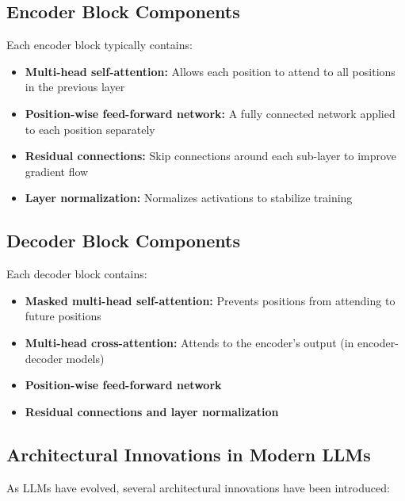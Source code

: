 \documentclass[11pt,a4paper]{report}
\begin{document}
\subsection{Encoder Block Components}
Each encoder block typically contains:
\begin{itemize}
    \item \textbf{Multi-head self-attention:} Allows each position to attend to all positions in the previous layer
    \item \textbf{Position-wise feed-forward network:} A fully connected network applied to each position separately
    \item \textbf{Residual connections:} Skip connections around each sub-layer to improve gradient flow
    \item \textbf{Layer normalization:} Normalizes activations to stabilize training
\end{itemize}

\subsection{Decoder Block Components}
Each decoder block contains:
\begin{itemize}
    \item \textbf{Masked multi-head self-attention:} Prevents positions from attending to future positions
    \item \textbf{Multi-head cross-attention:} Attends to the encoder's output (in encoder-decoder models)
    \item \textbf{Position-wise feed-forward network}
    \item \textbf{Residual connections and layer normalization}
\end{itemize}

\subsection{Architectural Innovations in Modern LLMs}
As LLMs have evolved, several architectural innovations have been introduced:
\end{document}
